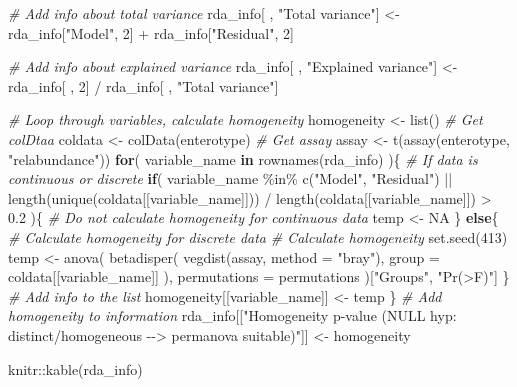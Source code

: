 \documentclass[
]{book}
\newenvironment{Shaded}{\begin{snugshade}}{\end{snugshade}}
\newcommand{\AttributeTok}[1]{\textcolor[rgb]{0.77,0.63,0.00}{#1}}
\newcommand{\CommentTok}[1]{\textcolor[rgb]{0.56,0.35,0.01}{\textit{#1}}}
\newcommand{\ConstantTok}[1]{\textcolor[rgb]{0.00,0.00,0.00}{#1}}
\newcommand{\ControlFlowTok}[1]{\textcolor[rgb]{0.13,0.29,0.53}{\textbf{#1}}}
\newcommand{\DecValTok}[1]{\textcolor[rgb]{0.00,0.00,0.81}{#1}}
\newcommand{\FloatTok}[1]{\textcolor[rgb]{0.00,0.00,0.81}{#1}}
\newcommand{\FunctionTok}[1]{\textcolor[rgb]{0.00,0.00,0.00}{#1}}
\newcommand{\NormalTok}[1]{#1}
\newcommand{\OtherTok}[1]{\textcolor[rgb]{0.56,0.35,0.01}{#1}}
\newcommand{\SpecialCharTok}[1]{\textcolor[rgb]{0.00,0.00,0.00}{#1}}
\newcommand{\StringTok}[1]{\textcolor[rgb]{0.31,0.60,0.02}{#1}}
\begin{document}
\begin{Shaded}
\begin{Highlighting}[]
\CommentTok{\# Add info about total variance}
\NormalTok{rda\_info[ , }\StringTok{"Total variance"}\NormalTok{] }\OtherTok{\textless{}{-}}\NormalTok{ rda\_info[}\StringTok{"Model"}\NormalTok{, }\DecValTok{2}\NormalTok{] }\SpecialCharTok{+}
\NormalTok{    rda\_info[}\StringTok{"Residual"}\NormalTok{, }\DecValTok{2}\NormalTok{]}

\CommentTok{\# Add info about explained variance}
\NormalTok{rda\_info[ , }\StringTok{"Explained variance"}\NormalTok{] }\OtherTok{\textless{}{-}}\NormalTok{ rda\_info[ , }\DecValTok{2}\NormalTok{] }\SpecialCharTok{/} 
\NormalTok{    rda\_info[ , }\StringTok{"Total variance"}\NormalTok{]}

\CommentTok{\# Loop through variables, calculate homogeneity}
\NormalTok{homogeneity }\OtherTok{\textless{}{-}} \FunctionTok{list}\NormalTok{()}
\CommentTok{\# Get colDtaa}
\NormalTok{coldata }\OtherTok{\textless{}{-}} \FunctionTok{colData}\NormalTok{(enterotype)}
\CommentTok{\# Get assay}
\NormalTok{assay }\OtherTok{\textless{}{-}} \FunctionTok{t}\NormalTok{(}\FunctionTok{assay}\NormalTok{(enterotype, }\StringTok{"relabundance"}\NormalTok{))}
\ControlFlowTok{for}\NormalTok{( variable\_name }\ControlFlowTok{in} \FunctionTok{rownames}\NormalTok{(rda\_info) )\{}
    \CommentTok{\# If data is continuous or discrete}
    \ControlFlowTok{if}\NormalTok{( variable\_name }\SpecialCharTok{\%in\%} \FunctionTok{c}\NormalTok{(}\StringTok{"Model"}\NormalTok{, }\StringTok{"Residual"}\NormalTok{) }\SpecialCharTok{||}
        \FunctionTok{length}\NormalTok{(}\FunctionTok{unique}\NormalTok{(coldata[[variable\_name]])) }\SpecialCharTok{/}
        \FunctionTok{length}\NormalTok{(coldata[[variable\_name]]) }\SpecialCharTok{\textgreater{}} \FloatTok{0.2}\NormalTok{ )\{}
        \CommentTok{\# Do not calculate homogeneity for continuous data}
\NormalTok{        temp }\OtherTok{\textless{}{-}} \ConstantTok{NA}
\NormalTok{    \} }\ControlFlowTok{else}\NormalTok{\{}
        \CommentTok{\# Calculate homogeneity for discrete data}
        \CommentTok{\# Calculate homogeneity}
        \FunctionTok{set.seed}\NormalTok{(}\DecValTok{413}\NormalTok{)}
\NormalTok{        temp }\OtherTok{\textless{}{-}} \FunctionTok{anova}\NormalTok{(}
            \FunctionTok{betadisper}\NormalTok{( }
                \FunctionTok{vegdist}\NormalTok{(assay, }\AttributeTok{method =} \StringTok{"bray"}\NormalTok{),}
                \AttributeTok{group =}\NormalTok{ coldata[[variable\_name]] ),}
            \AttributeTok{permutations =}\NormalTok{ permutations )[}\StringTok{"Groups"}\NormalTok{, }\StringTok{"Pr(\textgreater{}F)"}\NormalTok{]}
\NormalTok{    \}}
    \CommentTok{\# Add info to the list}
\NormalTok{    homogeneity[[variable\_name]] }\OtherTok{\textless{}{-}}\NormalTok{ temp}
\NormalTok{\}}
\CommentTok{\# Add homogeneity to information}
\NormalTok{rda\_info[[}\StringTok{"Homogeneity p{-}value (NULL hyp: distinct/homogeneous {-}{-}\textgreater{} permanova suitable)"}\NormalTok{]] }\OtherTok{\textless{}{-}}
\NormalTok{    homogeneity}

\NormalTok{knitr}\SpecialCharTok{::}\FunctionTok{kable}\NormalTok{(rda\_info)}
\end{Highlighting}
\end{Shaded}
\end{document}
